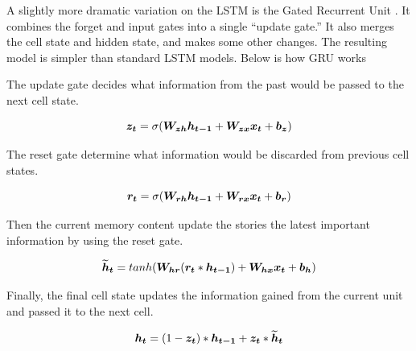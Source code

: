 A slightly more dramatic variation on the LSTM is the Gated Recurrent Unit \cite{1406.1078}.
It combines the forget and input gates into a single “update gate.” 
It also merges the cell state and hidden state, and makes some other changes. 
The resulting model is simpler than standard LSTM models.
Below is how GRU works

The update gate decides what information from the past would be passed to the next cell state.

\[\vect{z_t} = \sigma(\matr{W_{zh}}\vect{h_{t-1}}+\matr{W_{zx}}\vect{x_t} + \vect{b_z}) \]

The reset gate determine what information would be discarded from previous cell states.

\[\vect{r_t} = \sigma(\matr{W_{rh}}\vect{h_{t-1}}+\matr{W_{rx}}\vect{x_t} + \vect{b_r}) \]

Then the current memory content update the stories the latest important information by using the reset gate.

\[\vect{\widetilde{h}_t} = tanh(\matr{W_{hr}}(\vect{r_t}*\vect{h_{t-1}}) + \matr{W_{hx}}\vect{x_t} + \vect{b_h})\]

Finally, the final cell state updates the information gained from the current unit and passed it to the next cell.

\[\vect{h_t} = (1-\vect{z_t})*\vect{h_{t-1}} + \vect{z_t}*\vect{\widetilde{h}_t}\]